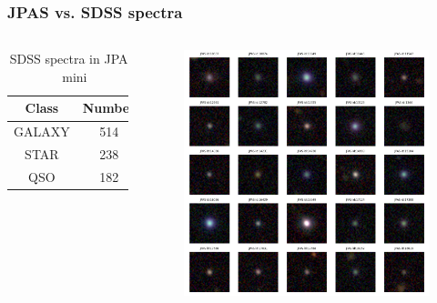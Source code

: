 \documentclass{beamer}
\begin{document}
\begin{frame}
    \frametitle{JPAS vs. SDSS spectra}
    \begin{columns}
        \begin{table}
            \caption{SDSS spectra in JPAS-mini}
            \centering
            \begin{tabular}{|c|c|}
                \hline
                Class & Number \\
                \hline
                    GALAXY   & 514 \\
                    STAR     & 238 \\
                    QSO      & 182 \\
                \hline
            \end{tabular}
        \end{table}
        \begin{figure}
            \centering
            \includegraphics[width=1.0\textwidth]{../../figs/sdss_quasars.png}
        \end{figure}
        \end{columns}
\end{frame}
\end{document}
